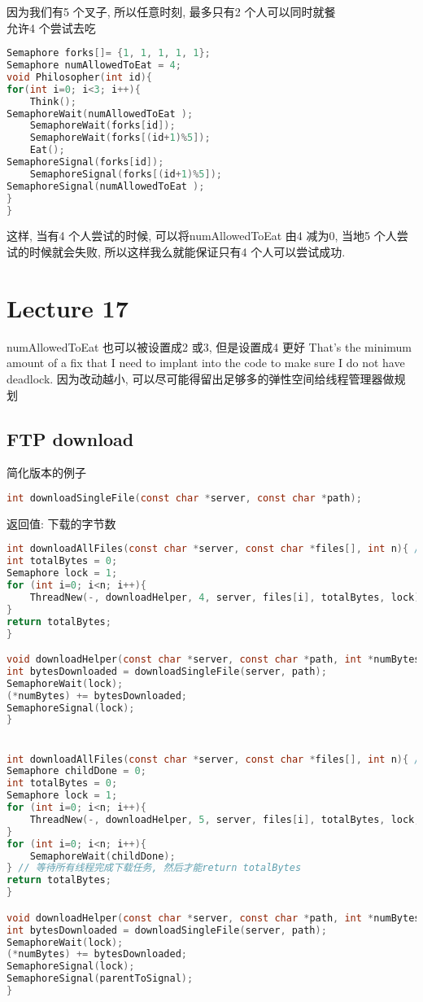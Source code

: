 \documentclass{article}
\begin{document}
因为我们有5 个叉子, 所以任意时刻, 最多只有2 个人可以同时就餐\\
允许4 个尝试去吃
\begin{lstlisting}[language = C]
Semaphore forks[]= {1, 1, 1, 1, 1};
Semaphore numAllowedToEat = 4;
void Philosopher(int id){
for(int i=0; i<3; i++){
	Think();
SemaphoreWait(numAllowedToEat );
	SemaphoreWait(forks[id]);
	SemaphoreWait(forks[(id+1)%5]);
	Eat();
SemaphoreSignal(forks[id]);
	SemaphoreSignal(forks[(id+1)%5]);
SemaphoreSignal(numAllowedToEat );
}
}
\end{lstlisting}
这样, 当有4 个人尝试的时候, 可以将numAllowedToEat 由4 减为0, 当地5 个人尝试的时候就会失败, 所以这样我么就能保证只有4 个人可以尝试成功.

\section{Lecture 17}
numAllowedToEat 也可以被设置成2 或3, 但是设置成4 更好
That's the minimum amount of a fix that I need to implant into the code to make sure I do not have deadlock.
因为改动越小, 可以尽可能得留出足够多的弹性空间给线程管理器做规划

\subsection{FTP download}
简化版本的例子
\begin{lstlisting}[language = C]
int downloadSingleFile(const char *server, const char *path);
\end{lstlisting}
返回值: 下载的字节数

\begin{lstlisting}[language = C]
int downloadAllFiles(const char *server, const char *files[], int n){ // n files
int totalBytes = 0;
Semaphore lock = 1;
for (int i=0; i<n; i++){
	ThreadNew(-, downloadHelper, 4, server, files[i], totalBytes, lock);
}
return totalBytes;
}

void downloadHelper(const char *server, const char *path, int *numBytes, Semaphore lock){
int bytesDownloaded = downloadSingleFile(server, path);
SemaphoreWait(lock);
(*numBytes) += bytesDownloaded;
SemaphoreSignal(lock);
}


int downloadAllFiles(const char *server, const char *files[], int n){ // n files
Semaphore childDone = 0;
int totalBytes = 0;
Semaphore lock = 1;
for (int i=0; i<n; i++){
	ThreadNew(-, downloadHelper, 5, server, files[i], totalBytes, lock, childDone);
}
for (int i=0; i<n; i++){
	SemaphoreWait(childDone);
} // 等待所有线程完成下载任务, 然后才能return totalBytes
return totalBytes;
}

void downloadHelper(const char *server, const char *path, int *numBytes, Semaphore lock, Semaphore parentToSignal){
int bytesDownloaded = downloadSingleFile(server, path);
SemaphoreWait(lock);
(*numBytes) += bytesDownloaded;
SemaphoreSignal(lock);
SemaphoreSignal(parentToSignal);
}
\end{lstlisting}
\end{document}
